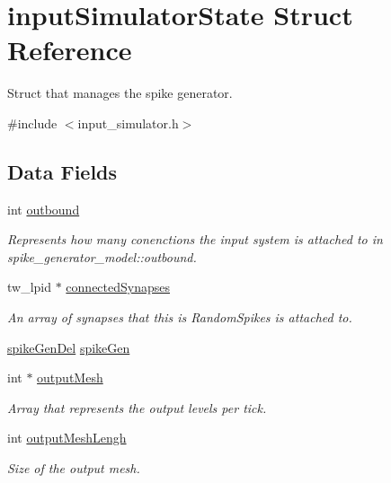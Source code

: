 \hypertarget{structinput_simulator_state}{}\section{input\+Simulator\+State Struct Reference}
\label{structinput_simulator_state}


Struct that manages the spike generator.  




{\ttfamily \#include $<$input\+\_\+simulator.\+h$>$}

\subsection*{Data Fields}
\begin{DoxyCompactItemize}
\item 
int \hyperlink{structinput_simulator_state_af892db49cef1c5e5d95010561e549678}{outbound}
\begin{DoxyCompactList}\small\item\em Represents how many conenctions the input system is attached to in spike\+\_\+generator\+\_\+model\+::outbound. \end{DoxyCompactList}\item 
tw\+\_\+lpid $\ast$ \hyperlink{structinput_simulator_state_a569dc67b8984bb0a3616bf17f9763ebb}{connected\+Synapses}
\begin{DoxyCompactList}\small\item\em An array of synapses that this is Random\+Spikes is attached to. \end{DoxyCompactList}\item 
\hyperlink{input__simulator_8h_aa47e87d309aab7727810011578bae86e}{spike\+Gen\+Del} \hyperlink{structinput_simulator_state_ae40f21a48f3157bcad074f424046ed2c}{spike\+Gen}
\item 
int $\ast$ \hyperlink{structinput_simulator_state_a666eb9ad96121cf3e4ce134e1a4c12c0}{output\+Mesh}
\begin{DoxyCompactList}\small\item\em Array that represents the output levels per tick. \end{DoxyCompactList}\item 
int \hyperlink{structinput_simulator_state_a97727a3be0dbd5813f860c99733048a8}{output\+Mesh\+Lengh}
\begin{DoxyCompactList}\small\item\em Size of the output mesh. \end{DoxyCompactList}\item 

\end{DoxyCompactItemize}
